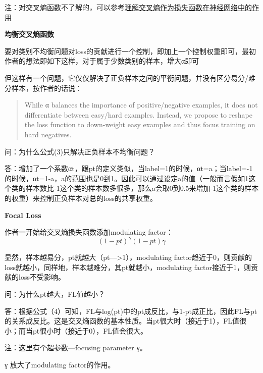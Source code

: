 \begin{figure}
\centering
\caption{}
\end{figure}

注：对交叉熵函数不了解的，可以参考\href{https://blog.csdn.net/chaipp0607/article/details/73392175}{理解交叉熵作为损失函数在神经网络中的作用}

\textbf{均衡交叉熵函数}

要对类别不均衡问题对loss的贡献进行一个控制，即加上一个控制权重即可，最初作者的想法即如下这样，对于属于少数类别的样本，增大α即可

\begin{figure}
\centering
\caption{}
\end{figure}

但这样有一个问题，它仅仅解决了正负样本之间的平衡问题，并没有区分易分/难分样本，按作者的话说：

\begin{quote}
While α balances the importance of positive/negative examples, it does
not differentiate between easy/hard examples. Instead, we propose to
reshape the loss function to down-weight easy examples and thus focus
training on hard negatives.
\end{quote}

问：为什么公式(3)只解决正负样本不均衡问题？

答：增加了一个系数αt，跟pt的定义类似，当label=1的时候，αt=a；当label=-1的时候，αt=1-a，a的范围也是0到1。因此可以通过设定a的值（一般而言假如1这个类的样本数比-1这个类的样本数多很多，那么a会取0到0.5来增加-1这个类的样本的权重）来控制正负样本对总的loss的共享权重。

\textbf{Focal Loss}

作者一开始给交叉熵损失函数添加modulating factor： \[
(1-pt)^γ(1−pt)γ
\] %

显然，样本越易分，pt就越大（pt---\textgreater{}1），modulating
factor趋近于0，则贡献的loss就越小，同样地，样本越难分，其pt就越小，modulating
factor接近于1，则贡献的loss不受影响。

问：为什么pt越大，FL值越小？

答：根据公式（4）可知，FL与log(pt)中的pt成反比，与1-pt成正比，因此FL与pt的关系成反比。这是交叉熵函数的基本性质。当pt很大时（接近于1），FL值很小；而当pt很小时（接近于0），FL值会很大。

注：这里有个超参数---focusing parameter γ。

γ 放大了modulating factor的作用。


